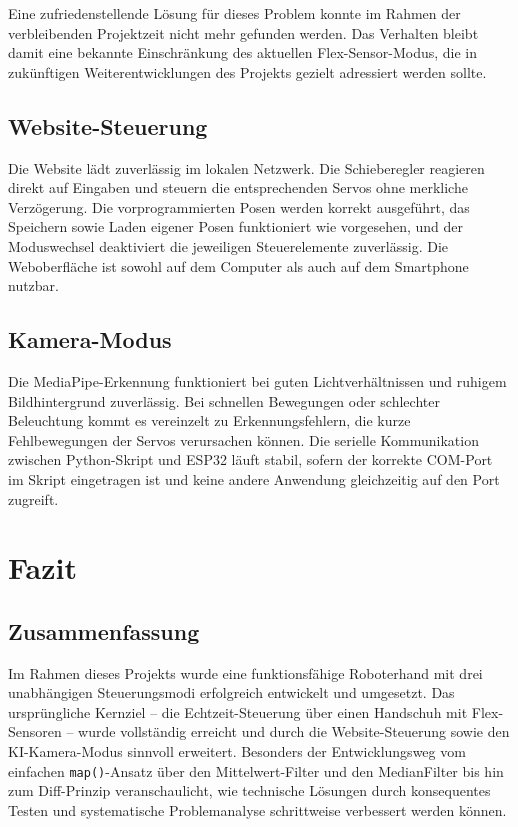 \documentclass[12pt,a4paper]{article}
\begin{document}
Eine zufriedenstellende Lösung für dieses Problem konnte im Rahmen der 
verbleibenden Projektzeit nicht mehr gefunden werden. Das Verhalten 
bleibt damit eine bekannte Einschränkung des aktuellen Flex-Sensor-Modus, 
die in zukünftigen Weiterentwicklungen des Projekts gezielt adressiert 
werden sollte.

\subsection{Website-Steuerung}

Die Website lädt zuverlässig im lokalen Netzwerk. Die Schieberegler reagieren direkt auf Eingaben und steuern die entsprechenden Servos ohne merkliche Verzögerung. Die vorprogrammierten Posen werden korrekt ausgeführt, das Speichern sowie Laden eigener Posen funktioniert wie vorgesehen, und der Moduswechsel deaktiviert die jeweiligen Steuerelemente zuverlässig. Die Weboberfläche ist sowohl auf dem Computer als auch auf dem Smartphone nutzbar.

\subsection{Kamera-Modus}

Die MediaPipe-Erkennung funktioniert bei guten Lichtverhältnissen und ruhigem Bildhintergrund zuverlässig. Bei schnellen Bewegungen oder schlechter Beleuchtung kommt es vereinzelt zu Erkennungsfehlern, die kurze Fehlbewegungen der Servos verursachen können. Die serielle Kommunikation zwischen Python-Skript und ESP32 läuft stabil, sofern der korrekte COM-Port im Skript eingetragen ist und keine andere Anwendung gleichzeitig auf den Port zugreift.

\newpage

\section{Fazit}

\subsection{Zusammenfassung}

Im Rahmen dieses Projekts wurde eine funktionsfähige Roboterhand mit drei unabhängigen Steuerungsmodi erfolgreich entwickelt und umgesetzt. Das ursprüngliche Kernziel -- die Echtzeit-Steuerung über einen Handschuh mit Flex-Sensoren -- wurde vollständig erreicht und durch die Website-Steuerung sowie den KI-Kamera-Modus sinnvoll erweitert. Besonders der Entwicklungsweg vom einfachen \texttt{map()}-Ansatz über den Mittelwert-Filter und den MedianFilter bis hin zum Diff-Prinzip veranschaulicht, wie technische Lösungen durch konsequentes Testen und systematische Problemanalyse schrittweise verbessert werden können.
\end{document}

